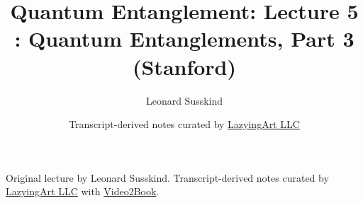 \documentclass[11pt,oneside]{book}
\begin{document}
\frontmatter
\title{Quantum Entanglement: Lecture 5 : Quantum Entanglements, Part 3 (Stanford)}
\author{Leonard Susskind}
\date{Transcript-derived notes curated by \href{https://lazying.art}{LazyingArt LLC}}
\maketitle
\begin{center}
\small Original lecture by Leonard Susskind. Transcript-derived notes curated by \href{https://lazying.art}{LazyingArt LLC} with \href{https://github.com/lachlanchen/Video2Book}{Video2Book}.
\end{center}
\clearpage
\mainmatter

\end{document}
